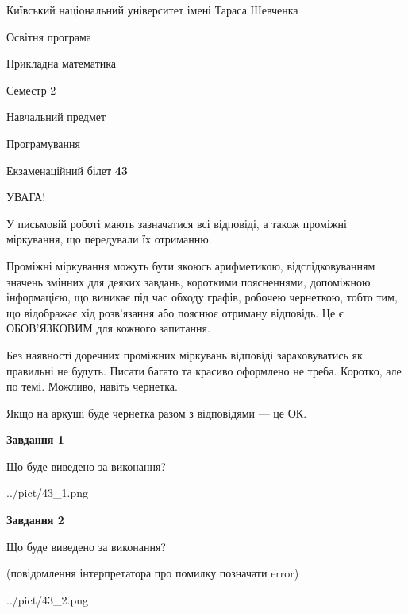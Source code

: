 \documentclass[12pt, ukrainian]{article}
\begin{document}
{{\begin {small}\par
{ \center  Київський національний університет імені Тараса Шевченка \par}
{\parbox {5 cm}{Освітня програма \hfill}{\parbox {7 cm}{Прикладна математика\hfill}}\parbox {6 cm}{\hfill Семестр 2}}\par
{\parbox {5 cm} {Навчальний предмет \hfill}\parbox {7 cm}{Програмування \hfill}\parbox {6cm}{\hfill}\par}\vspace{-7pt} \end{small}}{\center Екзаменаційний білет \No \textbf
{ 43 }\par}}
{
\begin {large}
УВАГА!

У письмовій роботі мають зазначатися всі відповіді, а також проміжні міркування, що передували їх отриманню.

Проміжні міркування можуть бути якоюсь арифметикою, відслідковуванням зна\-чень змінних для деяких завдань,
короткими поясненнями, допоміжною інформацією, що виникає під час обходу графів, робочею чернеткою,
тобто тим, що відображає хід розв’язання або пояснює отриману відповідь.
Це є ОБОВ’ЯЗКОВИМ для кожного запитання.

Без наявності доречних проміжних міркувань відповіді зараховуватись як правиль\-ні не будуть.
Писати багато та красиво оформлено не треба. Коротко, але по темі. Можли\-во, навіть чернетка.

Якщо на аркуші буде чернетка разом з відповідями --- це ОК.

\newpage

{\begin {center}\textbf{Завдання 1}\end {center}}\par
Що буде виведено за виконання?\par
\begin{center}
	{../pict/43_1.png}
\end{center}
\newpage

{\begin {center}\textbf{Завдання 2}\end {center}}\par
Що буде виведено за виконання?\par
 (повідомлення інтерпретатора про помилку позначати error)\par
\begin{center}
	{../pict/43_2.png}
\end{center}
\newpage


\end{large}}
\end{document}
